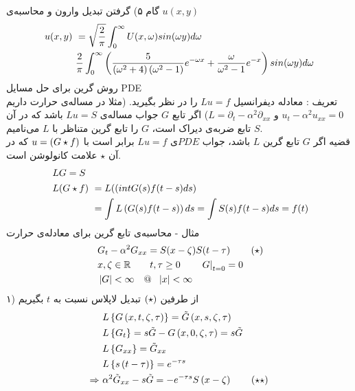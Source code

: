گام ۵) گرفتن تبدیل وارون و محاسبه‌ی 
$u(x,y)$
\begin{equation*}
	\begin{aligned}
		u(x,y) &\ = \sqrt\frac2\pi\int_0^\infty U(x,\omega)sin(\omega y)d\omega
		\\ &\
		\frac2\pi\int_0^\infty\left(\frac5{\left(\omega^2+4\right)\left(\omega^2-1\right)}e^{-\omega x}+\frac\omega{\omega^2-1}e^{-x}\right)sin(\omega y)d\omega
	\end{aligned}
\end{equation*}
روش گرین برای حل مسایل PDE\\
تعریف : معادله دیفرانسیل
$Lu=f$
را در نظر بگیرید. (مثلا در مساله‌ی حرارت داریم 
$u_t-\alpha^2 u_{xx}=0$
و
$L=\partial_t-\alpha^2\partial_{xx}$)
اگر تابع
$G$
جواب مساله‌ی
$Lu=S$
باشد که در آن
$S$
تابع ضربه‌ی دیراک است، 
$G$
را تابع گرین متناظر با
$L$
می‌نامیم.\\
قضیه اگر 
$G$
تابع گرین
$L$
باشد، جواب
$PDE$‌ی
$Lu=f$
برابر است با
$u=\left(G\star f\right)$
که در آن
$\star$
علامت کانولوشن است.
\begin{equation*}
	\begin{aligned}
		&\
		LG=S
		\\ &\
		\begin{aligned}
		L(G\star f)&\ =L(\left(int G(s)f(t-s)ds\right)
		\\ &\
		=\int L\left(G(s)f(t-s)\right)ds=\int S(s)f(t-s)ds=f(t)
		\end{aligned}
	\end{aligned}
\end{equation*}
مثال - محاسبه‌ی تابع گرین برای معادله‌ی حرارت
\begin{equation*}
	\begin{aligned}
		&\
		G_t-\alpha^2 G_{xx}=S(x-\zeta)S(t-\tau) \qquad \left(\star\right)
		\\ &\
		x,\zeta\in\mathbb{R}\qquad t,\tau\ge0 \qquad \left.G\right|_{t=0}=0
		\\ &\
		\left|G\right|<\infty \quad @ \ \ \left|x\right|<\infty
	\end{aligned}
\end{equation*}
۱) از طرفین
$\left(\star\right)$
تبدیل لاپلاس نسبت به
$t$
بگیریم
\begin{equation*}
	\begin{aligned}
		&\
		L\left\{G\left(x,t,\zeta,\tau\right)\right\}=\tilde{G}\left(x,s,\zeta,\tau\right)
		\\ &\
		L\left\{G_t\right\}=s\tilde{G}-G\left(x,0,\zeta,\tau\right)=s\tilde{G}
		\\ &\
		L\left\{G_{xx}\right\}=\tilde{G}_{xx}
		\\ &\
		L\left\{s\left(t-\tau\right)\right\}=e^{-\tau s}
		\\ \Rightarrow &\
		\alpha^2\tilde{G}_{xx}-s\tilde{G}=-e^{-\tau s}S\left(x-\zeta\right) \qquad\left(\star\star\right)
	\end{aligned}
\end{equation*}
